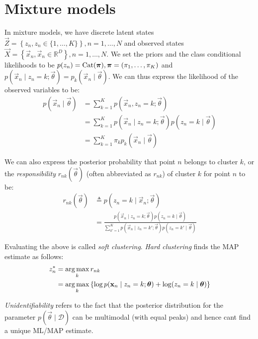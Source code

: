 \section{Mixture models}
In mixture models, we have discrete latent states $\vec Z = \left\{z_n, z_n \in \{1, \dotsc, K\}\right\}, n = 1, \dotsc, N$ and observed states $\vec X = \left\{\vec x_n, \vec x_n \in \mathbb R^D\right\}, n = 1, \dotsc, N$. We set the priors and the class conditional likelihoods to be $p(z_n) = \operatorname{Cat}(\boldsymbol{\mathbf{\pi}}), \boldsymbol{\mathbf{\pi}} = (\pi_1, \dotsc, \pi_K)$ and $p(\vec x_n \mid z_n = k; \vec \theta) = p_k(\vec x_n \mid \vec \theta)$. We can thus express the likelihood of the observed variables to be:
\begin{align}
    p(\vec x_n \mid \vec \theta)    &= \sum_{k = 1}^K p(\vec x_n, z_n = k; \vec \theta) \nonumber\\
                                    &= \sum_{k = 1}^K p(\vec x_n \mid z_n = k; \vec \theta) p(z_n = k \mid \vec \theta) \nonumber\\
                                    &= \sum_{k = 1}^K \pi_k p_k(\vec x_n \mid \vec \theta) \label{eqn:models-mm-lik}
\end{align}

We can also express the posterior probability that point $n$ belongs to cluster $k$, or the \emph{responsibility} $r_{nk}(\vec \theta)$ (often abbreviated as $r_{nk}$) of cluster $k$ for point $n$ to be:
\begin{align}
    r_{nk}(\vec \theta) &\triangleq p(z_n = k \mid \vec x_n; \vec \theta) \nonumber\\
                        &= \frac{p(\vec x_n \mid z_n = k; \vec \theta) p(z_n = k \mid \vec \theta)}{\sum_{k' = 1}^K p(\vec x_n \mid z_n = k'; \vec \theta) p(z_n = k' \mid \vec \theta)} \label{eqn:models-mm-responsibility}
\end{align}

Evaluating the above is called \emph{soft clustering}. \emph{Hard clustering} finds the MAP estimate as follows:
\begin{align}
    z_n^\ast    &= \operatorname*{arg\,max}_k r_{nk} \nonumber\\
                &= \operatorname*{arg\,max}_k \left\{\log p(\boldsymbol{\mathbf{x}}_n \mid z_n = k; \boldsymbol{\mathbf{\theta}}) + \log(z_n = k \mid \boldsymbol{\mathbf{\theta}})\right\}
\end{align}

\emph{Unidentifiability} refers to the fact that the posterior distribution for the parameter $p(\vec \theta \mid \mathcal D)$ can be multimodal (with equal peaks) and hence cant find a unique ML/MAP estimate.

